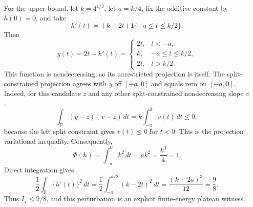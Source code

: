 For the upper bound, let \(k=4^{1/3}\), let \(a=k/4\), fix the additive constant by \(h(0)=0\), and take
\[
 h'(t)=(k-2t)\mathbf 1\{-a\le t\le k/2\}.
\]
Then
\[
 y(t)=2t+h'(t)=
 \begin{cases}
 2t,&t<-a,\\
 k,&-a\le t\le k/2,\\
 2t,&t>k/2.
 \end{cases}
\]
This function is nondecreasing, so its unrestricted projection is itself.  The split-constrained projection agrees with \(y\) off \([-a,0]\) and equals zero on \([-a,0]\).  Indeed, for this candidate \(z\) and any other split-constrained nondecreasing slope \(v\),
\[
 \int_{\mathbb R}(y-z)(v-z)\,dt
 =k\int_{-a}^{0}v(t)\,dt\le0,
\]
because the left split constraint gives \(v(t)\le0\) for \(t<0\).  This is the projection variational inequality.  Consequently,
\[
 \Phi(h)=\int_{-a}^{0}k^2\,dt=ak^2=\frac{k^3}{4}=1.
\]
Direct integration gives
\[
 \frac12\int_{\mathbb R}\{h'(t)\}^2\,dt
 =\frac12\int_{-a}^{k/2}(k-2t)^2\,dt
 =\frac{(k+2a)^3}{12}
 =\frac98.
\]
Thus \(I_\star\le9/8\), and this perturbation is an explicit finite-energy plateau witness.

